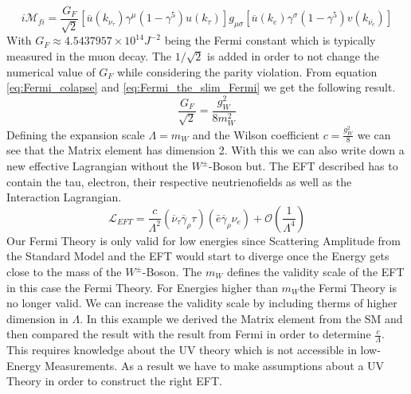 \documentclass[../Bachelorarbeit.tex]{subfiles}
\begin{document}
\begin{equation}
    i\mathcal{M}_{fi} = \frac{G_{F}}{\sqrt{2}} \left[ \overline{u}(k_{\nu_{\tau}})\gamma^{\mu}(1-\gamma^{5})u(k_{\tau}) \right] g_{\mu\sigma} \left[ \overline{u}(k_{e})\gamma^{\sigma}(1-\gamma^{5})v(k_{\overline{\nu_{e}}}) \right]
    \label{eq:Fermi_the_slim_Fermi}
\end{equation}
With $G_{F} \approx 4.5437957\times 10^{14} J^{-2}$ being the Fermi constant which is typically measured in the muon decay. The $1/\sqrt{2}$ is added in order to not change the numerical value of $G_{F}$ while considering the parity violation.
From equation \ref{eq:Fermi_colapse} and \ref{eq:Fermi_the_slim_Fermi} we get the following result.
\begin{equation}
    \frac{G_{F}}{\sqrt{2}} = \frac{g_{W}^{2}}{8 m_{W}^{2}}
\end{equation}
Defining the expansion scale $\Lambda=m_{W}$ and the Wilson coefficient $c= \frac{g_{W}^{2}}{8}$ we can see that the Matrix element has dimension 2.
With this we can also write down a new effective Lagrangian without the $W^{\pm }$-Boson but. The EFT described has to contain the tau, electron, their respective neutrienofields
as well as the Interaction Lagrangian.
\begin{equation}
    \mathcal{L}_{EFT} = \frac{c}{\Lambda^{2}} \left( \overline{\nu}_{\tau} \overline{\gamma}_{\rho} \tau \right) \left(\bar{e} \overline{\gamma}_{\rho} \nu_{e} \right) + \mathcal{O}(\frac{1}{\Lambda^{4}})
\end{equation}
Our Fermi Theory is only valid for low energies since Scattering Amplitude from the Standard Model and the EFT would
start to diverge once the Energy gets close to the mass of the $W^{\pm}$-Boson.
The $m_{W}$ defines the validity scale of the EFT in this case the Fermi Theory. For Energies higher than $m_{W}$the
Fermi Theory is no longer valid. We can increase the validity scale by including therms of higher dimension in $\Lambda$.
In this example we derived the Matrix element from the SM and then compared the result with the result from Fermi in
order to determine $\frac{c}{\Lambda}$. This requires knowledge about the UV theory which is not accessible in low-Energy
Measurements. As a result we have to make assumptions about a UV Theory in order to construct the right EFT.

%
\end{document}
